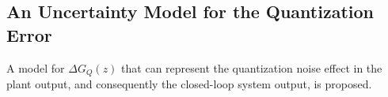 \documentclass{sig-alternate-05-2015}
\newcommand{\red}[1]{{\color{red}#1}}
\begin{document}
\subsection{An Uncertainty Model for the Quantization Error} 
\label{sec:uncertainty-model-quantization-error}

%

A model for $\Delta{G_{Q}(z)}$ that can represent the quantization
noise effect in the plant output, and consequently the closed-loop system
output, is proposed.  
\end{document}

